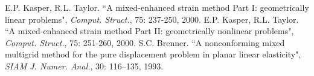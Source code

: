 \documentclass[preprint,12pt,authoryear]{elsarticle}
\begin{document}
\begin{thebibliography}{00}
 E.P. Kasper, R.L. Taylor. ``A mixed-enhanced strain method Part I: geometrically linear problems", 
{\it{Comput. Struct.}}, 75: 237-250, 2000.
 E.P. Kasper, R.L. Taylor. ``A mixed-enhanced strain method Part II: geometrically nonlinear problems", 
{\it{Comput. Struct.}}, 75: 251-260, 2000.
 S.C. Brenner. ``A nonconforming mixed multigrid method for the pure displacement problem in planar linear elasticity", 
{\it{SIAM J. Numer. Anal.}}, 30: 116–135, 1993.

\end{thebibliography}
\end{document}
